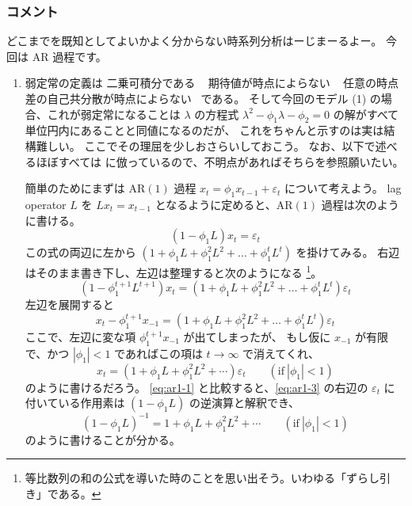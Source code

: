 \documentclass[./main.tex]{subfiles}
\begin{document}
    \subsubsection*{コメント}
    どこまでを既知としてよいかよく分からない時系列分析はーじまーるよー。
    今回は AR 過程です。
    \begin{enumerate}
        \item 弱定常の定義は  二乗可積分である \  期待値が時点によらない \  任意の時点差の自己共分散が時点によらない \ 
        である。
        そして今回のモデル (1) の場合、これが弱定常になることは
        $\lambda$ の方程式 $\lambda^2 - \phi_1 \lambda - \phi_2 = 0$ の解がすべて単位円内にあることと同値になるのだが、
        これをちゃんと示すのは実は結構難しい。
        ここでその理屈を少しおさらいしておこう。
        なお、以下で述べるほぼすべては \cite{hamilton1994series} に倣っているので、不明点があればそちらを参照願いたい。

        簡単のためにまずは $\text{AR} (1)$ 過程 $x_t = \phi_1 x_{t - 1} + \varepsilon_t$ について考えよう。
        lag operator $L$ を $L x_t = x_{t-1}$ となるように定めると、$\text{AR}(1)$ 過程は次のように書ける。
        \begin{equation}\label{eq:ar1-1}
            (1 - \phi_1 L) x_t = \varepsilon_t
        \end{equation}
        この式の両辺に左から $(1 + \phi_1 L + \phi_1^2 L^2 + \dots + \phi_1^t L^t)$ を掛けてみる。
        右辺はそのまま書き下し、左辺は整理すると次のようになる
        \footnote{等比数列の和の公式を導いた時のことを思い出そう。いわゆる「ずらし引き」である。}。
        \begin{equation*}
            (1 - \phi_1^{t + 1} L^{t+1}) x_t
                = (1 + \phi_1 L + \phi_1^2 L^2 + \dots + \phi_1^t L^t) \varepsilon_t
        \end{equation*}
        左辺を展開すると
        \begin{equation}\label{eq:ar1-2}
            x_t - \phi_1^{t + 1} x_{-1}
                = (1 + \phi_1 L + \phi_1^2 L^2 + \dots + \phi_1^t L^t) \varepsilon_t
        \end{equation}
        ここで、左辺に変な項 $\phi_1^{t+1} x_{-1}$ が出てしまったが、
        もし仮に $x_{-1}$ が有限で、かつ $|\phi_1| < 1$ であればこの項は $t \to \infty$ で消えてくれ、
        \begin{equation}\label{eq:ar1-3}
            x_t = (1 + \phi_1 L + \phi_1^2 L^2 + \cdots) \varepsilon_t
            \qquad (\text{if} \ |\phi_1| < 1)
        \end{equation}
        のように書けるだろう。
        \eqref{eq:ar1-1} と比較すると、\eqref{eq:ar1-3} の右辺の $\varepsilon_t$ に付いている作用素は $(1 -\phi_1 L)$ の逆演算と解釈でき、
        \begin{equation*}
            (1 - \phi_1 L)^{-1}
                = 1 + \phi_1 L + \phi_1^2 L^2 + \cdots
                \qquad (\text{if} \ |\phi_1| < 1)
        \end{equation*}
        のように書けることが分かる。




\end{enumerate}
\end{document}
